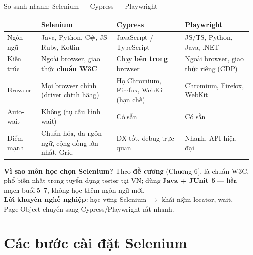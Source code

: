 \documentclass[aspectratio=169,12pt]{beamer}
\begin{document}
\begin{frame}{So sánh nhanh: Selenium --- Cypress --- Playwright}
  \begin{center}
  \scriptsize
  \setlength{\tabcolsep}{3pt}
  \begin{tabular}{>{\raggedright\arraybackslash}p{2.5cm}>{\raggedright\arraybackslash}p{3.4cm}>{\raggedright\arraybackslash}p{3.2cm}>{\raggedright\arraybackslash}p{3.4cm}}
    \toprule
     & \textbf{Selenium} & \textbf{Cypress} & \textbf{Playwright} \\
    \midrule
    Ngôn ngữ & Java, Python, C\#, JS, Ruby, Kotlin & JavaScript / TypeScript & JS/TS, Python, Java, .NET \\
    Kiến trúc & Ngoài browser, giao thức \textbf{chuẩn W3C} & Chạy \textbf{bên trong} browser & Ngoài browser, giao thức riêng (CDP) \\
    Browser & Mọi browser chính (driver chính hãng) & Họ Chromium, Firefox, WebKit (hạn chế) & Chromium, Firefox, WebKit \\
    Auto-wait & Không (tự cấu hình wait) & Có sẵn & Có sẵn \\
    Điểm mạnh & Chuẩn hóa, đa ngôn ngữ, cộng đồng lớn nhất, Grid & DX tốt, debug trực quan & Nhanh, API hiện đại \\
    \bottomrule
  \end{tabular}
  \end{center}

  {\small \textbf{Vì sao môn học chọn Selenium?} Theo \textbf{đề cương}
  (Chương 6), là chuẩn W3C, phổ biến nhất trong tuyển dụng tester tại VN;
  dùng \textbf{Java + JUnit 5} --- liền mạch buổi 5--7, không học thêm ngôn
  ngữ mới.\\[0.25em]
  \textbf{Lời khuyên nghề nghiệp}: học vững Selenium $\to$ khái niệm locator,
  wait, Page Object chuyển sang Cypress/Playwright rất nhanh.}
\end{frame}

\section{Các bước cài đặt Selenium}
\end{document}
